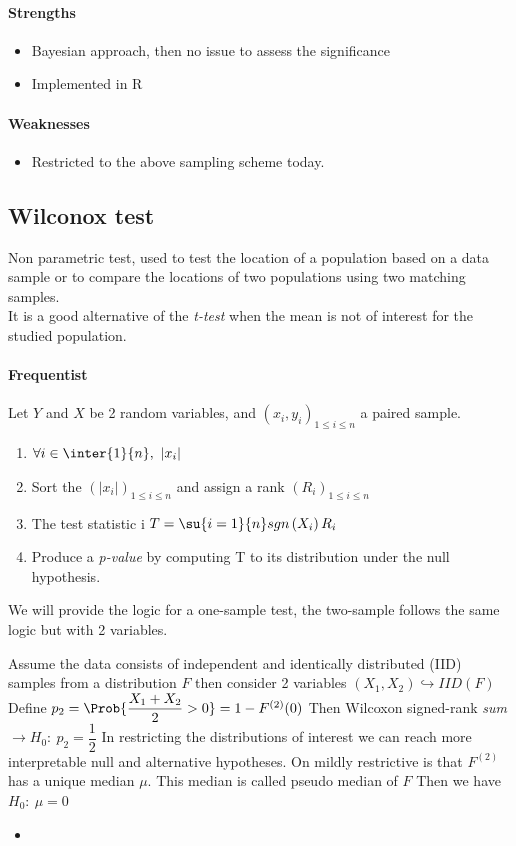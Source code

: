 \paragraph{Strengths}
\begin{itemize}
    \item Bayesian approach, then no issue to assess the significance
    \item Implemented in R
\end{itemize}

\paragraph{Weaknesses}
\begin{itemize}
    \item Restricted to the above sampling scheme today. 
\end{itemize}


\subsection{Wilconox test}
Non parametric test, used to test the location of a population based on a data sample or 
to compare the locations of two populations using two matching samples.\\
It is a good alternative of the \emph{t-test} when the mean is not of interest for the 
studied population.
\paragraph{Frequentist}
Let $Y$ and $X$ be 2 random variables, and $\left(x_{i}, y_{i}\right)_{1\leq i\leq n}$
a paired sample. 
\begin{enumerate}
    \item $\forall i\in\inter{1}{n},~\left|x_{i}\right|$
    \item Sort the $\left(\left|x_{i}\right|\right)_{1\leq i\leq n}$ and assign a rank
        $\left(R_{i}\right)_{1\leq i\leq n}$
    \item The test statistic i $T=\su{i=1}{n}sgn\left(X_{i}\right)R_{i}$
    \item Produce a \emph{p-value} by computing T to its distribution under the null
        hypothesis.
\end{enumerate}
We will provide the logic for a one-sample test, the two-sample follows the same logic but
with 2 variables.

Assume the data consists of independent and identically distributed (IID) samples from a
distribution $F$ then consider 2 variables $(X_{1}, X_{2})\hookrightarrow IID(F)$
Define $p_{2} = \Prob{\dfrac{X_{1} + X_{2}}{2}>0} = 1-F^{(2)}(0)$
Then Wilcoxon signed-rank \emph{sum} $\rightarrow H_{0}:~p_{2} = \dfrac{1}{2}$
In restricting the distributions of interest we can reach more interpretable null and 
alternative hypotheses. On mildly restrictive is that $F^(2)$ has a unique median $\mu$. 
This median is called pseudo median of $F$
Then we have $H_{0}:~\mu=0$
\begin{itemize}
    \item  
\end{itemize}


